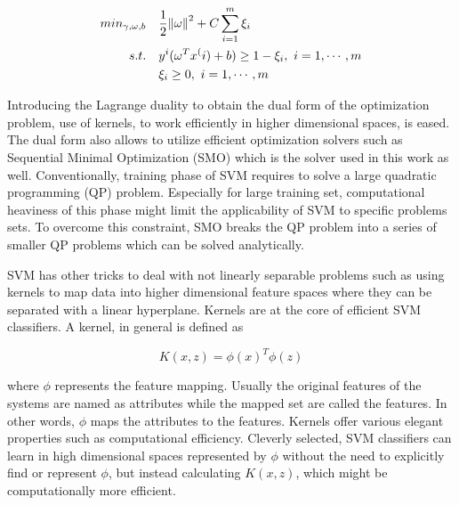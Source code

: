 \begin{align}
min_{\gamma,\omega,b} \quad & \frac{1}{2} \norm{\omega}^2 + C \sum\limits_{i = 1}^m \xi_i \\
s.t. \quad & y^{i}(\omega^T x^(i) + b) \geq 1 - \xi_i, \ i = 1, \cdots, m\\
 & \xi_i \geq 0, \ i = 1, \cdots, m
\end{align}


Introducing the Lagrange duality to obtain the dual form of the optimization problem, use of kernels, to work efficiently in higher dimensional spaces, is eased. 
The dual form also allows to utilize efficient optimization solvers such as Sequential Minimal Optimization (SMO)  \cite{platt1998sequential} which is the solver used in this work as well. Conventionally, training phase of SVM requires to solve a large quadratic programming (QP) problem. Especially for large training set, computational heaviness of this phase might limit the applicability of SVM to specific problems sets. To overcome this constraint, SMO breaks the QP problem into a series of smaller QP problems which can be solved analytically. 


SVM has other tricks to deal with not linearly separable problems such as using kernels to map data into higher dimensional feature spaces where they can be separated with a linear hyperplane. Kernels are at the core of efficient SVM classifiers. A kernel, in general is defined as

\begin{equation}
K (x,z) = {\phi(x)}^T \phi(z)
\end{equation}

where $\phi$ represents the feature mapping. Usually the original features of the systems are named as attributes while the mapped set are called the features. In other words, $\phi$ maps the attributes to the features. Kernels offer various elegant properties such as computational efficiency. 
Cleverly selected, SVM classifiers can learn in high dimensional spaces represented by $\phi$ without the need to explicitly find or represent $\phi$, but instead calculating $K(x,z)$, which might be computationally more efficient. 

